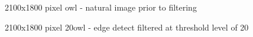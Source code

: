 \documentclass[12pt, oneside]{book}
\begin{document}
\begin{figure}[!b]
  \centering
  \caption[2100x1800 pixel owl]{2100x1800 pixel owl - natural image prior to filtering}
  \label{fig:owl_bmp}
\end{figure}

\begin{figure}[!b]
  \centering
  \caption[2100x1800 pixel 20owl]{2100x1800 pixel 20owl - edge detect filtered at threshold level of 20}
  \label{fig:20owl_png}
\end{figure}
\end{document}
